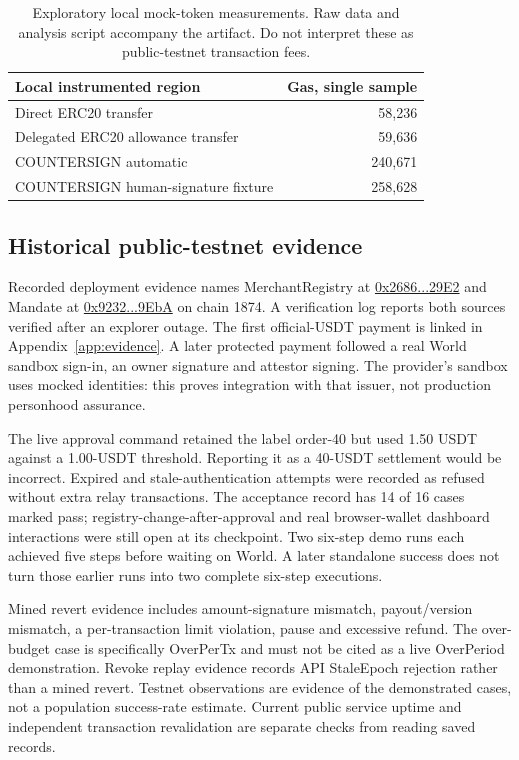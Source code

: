 \documentclass[11pt]{article}
\begin{document}
\begin{table}[ht]\centering
\begin{tabular}{lr}\toprule Local instrumented region & Gas, single sample\\\midrule
Direct ERC20 transfer & 58,236\\
Delegated ERC20 allowance transfer & 59,636\\
COUNTERSIGN automatic & 240,671\\
COUNTERSIGN human-signature fixture & 258,628\\\bottomrule\end{tabular}
\caption{Exploratory local mock-token measurements. Raw data and analysis script accompany the artifact. Do not interpret these as public-testnet transaction fees.}\end{table}


\subsection{Historical public-testnet evidence}
Recorded deployment evidence names MerchantRegistry at
\href{https://explorer.testnet.whitechain.io/address/0x2686f693A2C959568e650e0A5563E6244f2329E2}{0x2686...29E2} and Mandate at
\href{https://explorer.testnet.whitechain.io/address/0x923298375911A173da34C715da2718c0c9889EbA}{0x9232...9EbA} on chain 1874. A verification log reports both sources verified after an explorer outage. The first official-USDT payment is linked in Appendix~\ref{app:evidence}. A later protected payment followed a real World sandbox sign-in, an owner signature and attestor signing. The provider's sandbox uses mocked identities: this proves integration with that issuer, not production personhood assurance.

The live approval command retained the label order-40 but used 1.50 USDT against a 1.00-USDT threshold. Reporting it as a 40-USDT settlement would be incorrect. Expired and stale-authentication attempts were recorded as refused without extra relay transactions. The acceptance record has 14 of 16 cases marked pass; registry-change-after-approval and real browser-wallet dashboard interactions were still open at its checkpoint. Two six-step demo runs each achieved five steps before waiting on World. A later standalone success does not turn those earlier runs into two complete six-step executions.

Mined revert evidence includes amount-signature mismatch, payout/version mismatch, a per-transaction limit violation, pause and excessive refund. The over-budget case is specifically OverPerTx and must not be cited as a live OverPeriod demonstration. Revoke replay evidence records API StaleEpoch rejection rather than a mined revert. Testnet observations are evidence of the demonstrated cases, not a population success-rate estimate. Current public service uptime and independent transaction revalidation are separate checks from reading saved records.
\end{document}
